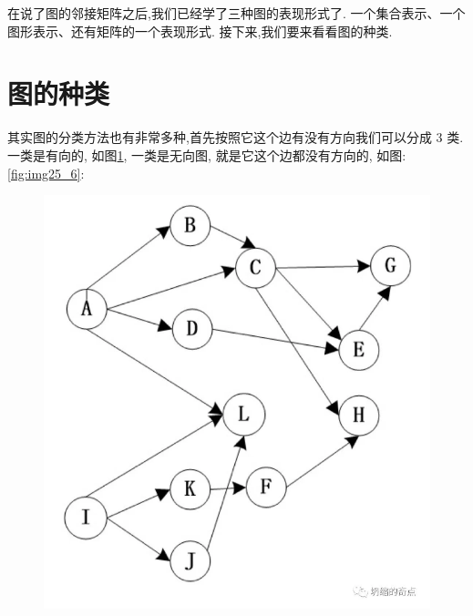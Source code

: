 在说了图的邻接矩阵之后,我们已经学了三种图的表现形式了. 一个集合表示、一个图形表示、还有矩阵的一个表现形式. 接下来,我们要来看看图的种类. 

\section{图的种类}

其实图的分类方法也有非常多种,首先按照它这个边有没有方向我们可以分成 3 类. 一类是有向的, 如图\ref{fig:img25_5}, 一类是无向图, 就是它这个边都没有方向的, 如图:\ref{fig:img25_6}: 

\begin{figure}[ht]
  \centering
  \begin{minipage}[h]{0.4\textwidth}
    \includegraphics[width=\textwidth]{asset/20231227145133.png}
    \caption{}
    \label{fig:img25_5}
  \end{minipage}%
  \hspace{1em}
  \begin{minipage}[h]{0.4\textwidth}

\end{minipage}
\end{figure}
